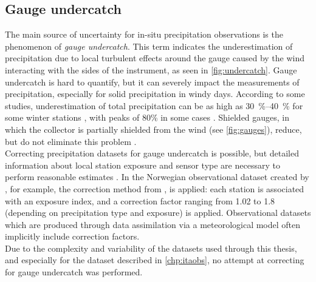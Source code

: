 \subsection{Gauge undercatch} \label{sec:gauge_undercatch}
The main source of uncertainty for in-situ precipitation observations is the phenomenon of \emph{gauge undercatch}. This term indicates the underestimation of precipitation due to local turbulent effects around the gauge caused by the wind interacting with the sides of the instrument, as seen in \cref{fig:undercatch}. Gauge undercatch is hard to quantify, but it can severely impact the measurements of precipitation, especially for solid precipitation in windy days. According to some studies, underestimation of total precipitation can be as high as \SIrange{30}{40}{\%} for some winter stations \citep{adam2003Adjglogripresysbia, Isotta2014, Kochendorfer2017a}, with peaks of 80\% in some cases \citep{Kochendorfer2017, Wolff2015}. 
Shielded gauges, in which the collector is partially shielded from the wind (see \cref{fig:gauges}), reduce, but do not eliminate this problem \citep{Duchon2001}.\\
Correcting precipitation datasets for gauge undercatch is possible, but detailed information about local station exposure and sensor type are necessary to perform reasonable estimates \citep[see e.g.][]{Johansson2002, Mohr2009, Adler2018}.
In the Norwegian observational dataset created by \citet{Mohr2009}, for example, the correction method from \citet{Forland1996}, is applied: each station is associated with an exposure index, and a correction factor ranging from 1.02 to 1.8 (depending on precipitation type and exposure) is applied.
Observational datasets which are produced through data assimilation via a meteorological model \citep[see e.g.][]{Vidal2010, Landelius2016} often implicitly include correction factors.\\
Due to the complexity and variability of the datasets used through this thesis, and especially for the dataset described in \cref{chp:itaobs}, no attempt at correcting for gauge undercatch was performed.

